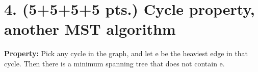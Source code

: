 \documentclass[11pt]{article}
\begin{document}
%

\newpage

\section*{4. (5+5+5+5 pts.) Cycle property, another MST algorithm}

{\bf Property: }Pick any cycle in the graph, and let e be the heaviest edge in that cycle. Then there is a minimum spanning tree that does not contain e.
\end{document}
